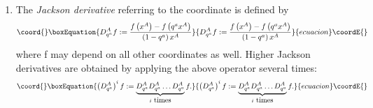 \documentclass[a4paper,11pt,oneside]{article}
\providecommand{\text}[1]{\mbox{#1}}
\begin{document}
\begin{enumerate}
\item  The \textit{Jackson derivative} referring to the coordinate \coordHE{} is
defined by 
\begin{equation}\coord{}\boxEquation{
D_{q^{a}}^{A}f:=\frac{f\left( x^{A}\right) -f\left( q^{a}x^{A}\right) }{
\left( 1-q^{a}\right) x^{A}}
}{
D_{q^{a}}^{A}f:=\frac{f\left( x^{A}\right) -f\left( q^{a}x^{A}\right) }{
\left( 1-q^{a}\right) x^{A}}
}{ecuacion}\coordE{}\end{equation}
where f may depend on all other coordinates as well. Higher Jackson
derivatives are obtained by applying the above operator \coordHE{}
several times: 
\begin{equation}\coord{}\boxEquation{
\left( D_{q^{a}}^{A}\right) ^{i}f:=\underbrace{D_{q^{a}}^{A}D_{q^{a}}^{A}
\ldots D_{q^{a}}^{A}}_{i\text{ times}}f.
}{
\left( D_{q^{a}}^{A}\right) ^{i}f:=\underbrace{D_{q^{a}}^{A}D_{q^{a}}^{A}
\ldots D_{q^{a}}^{A}}_{i\text{ times}}f.
}{ecuacion}\coordE{}\end{equation}


\end{enumerate}
\end{document}
